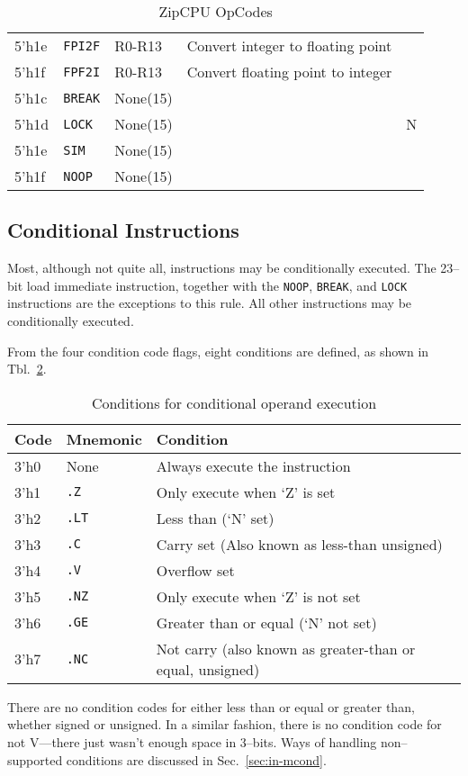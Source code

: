 \documentclass{gqtekspec}
\begin{document}
\begin{table}
\begin{center}
\begin{tabular}{|l|l|l|l|c|}
5'h1e & {\tt FPI2F} & R0-R13 & Convert integer to floating point &   \\\cline{1-4}
5'h1f & {\tt FPF2I} & R0-R13 & Convert floating point to integer &   \\\hline\hline
5'h1c & {\tt BREAK} &None(15)&& \\\cline{1-4}
5'h1d & {\tt LOCK} &None(15)&& N\\\cline{1-4}
5'h1e & {\tt SIM}  &None(15)&&\\\cline{1-4}
5'h1f & {\tt NOOP} &None(15)&&\\\hline
\end{tabular}
\caption{ZipCPU OpCodes}\label{tbl:iset-opcodes}
\end{center}\end{table}
%
\subsection{Conditional Instructions}\label{sec:isa-cond}
Most, although not quite all, instructions may be conditionally executed.  
The 23--bit load immediate instruction, together with the {\tt NOOP}, 
{\tt BREAK}, and {\tt LOCK} instructions are the exceptions to this rule.
All other instructions may be conditionally executed.

From the four condition code flags, eight conditions are defined, as shown in
Tbl.~\ref{tbl:conditions}.
\begin{table}\begin{center}
\begin{tabular}{l|l|l}
Code & Mnemonic & Condition \\\hline
3'h0 & None & Always execute the instruction \\
3'h1 & {\tt .Z} & Only execute when `Z' is set \\
3'h2 & {\tt .LT}& Less than (`N' set) \\
3'h3 & {\tt .C} & Carry set (Also known as less-than unsigned) \\
3'h4 & {\tt .V} & Overflow set\\
3'h5 & {\tt .NZ}& Only execute when `Z' is not set \\
3'h6 & {\tt .GE}& Greater than or equal (`N' not set) \\
3'h7 & {\tt .NC}& Not carry (also known as greater-than or equal, unsigned) \\
\end{tabular}
\caption{Conditions for conditional operand execution}\label{tbl:conditions}
\end{center}\end{table}
There are no condition codes for either less than or equal or greater than,
whether signed or unsigned.  In a similar fashion, there is no condition
code for not V---there just wasn't enough space in 3--bits.  Ways of handling
non--supported conditions are discussed in Sec.~\ref{sec:in-mcond}.
\end{document}
